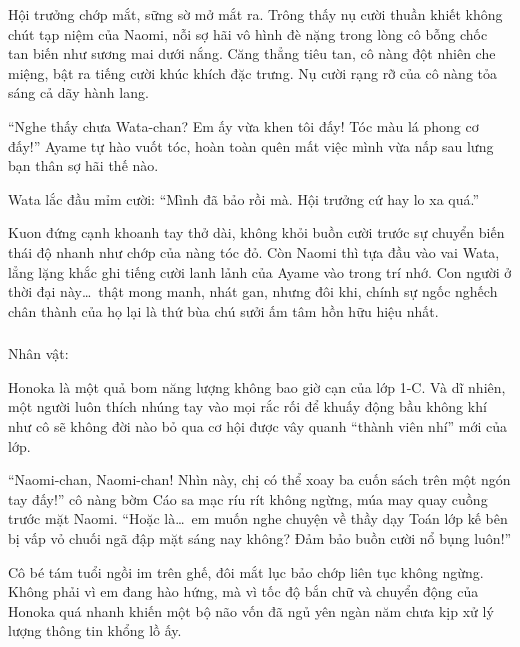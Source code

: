 \documentclass[../main.tex]{subfiles}
\begin{document}
Hội trưởng chớp mắt, sững sờ mở mắt ra. Trông thấy nụ cười thuần khiết không chút tạp niệm của Naomi, nỗi sợ hãi vô hình đè nặng trong lòng cô bỗng chốc tan biến như sương mai dưới nắng. Căng thẳng tiêu tan, cô nàng đột nhiên che miệng, bật ra tiếng cười khúc khích đặc trưng. Nụ cười rạng rỡ của cô nàng tỏa sáng cả dãy hành lang.

``Nghe thấy chưa Wata-chan? Em ấy vừa khen tôi đấy! Tóc màu lá phong cơ đấy!'' Ayame tự hào vuốt tóc, hoàn toàn quên mất việc mình vừa nấp sau lưng bạn thân sợ hãi thế nào.

Wata lắc đầu mỉm cười: ``Mình đã bảo rồi mà. Hội trưởng cứ hay lo xa quá.''

Kuon đứng cạnh khoanh tay thở dài, không khỏi buồn cười trước sự chuyển biến thái độ nhanh như chớp của nàng tóc đỏ. Còn Naomi thì tựa đầu vào vai Wata, lẳng lặng khắc ghi tiếng cười lanh lảnh của Ayame vào trong trí nhớ. Con người ở thời đại này\dots\ thật mong manh, nhát gan, nhưng đôi khi, chính sự ngốc nghếch chân thành của họ lại là thứ bùa chú sưởi ấm tâm hồn hữu hiệu nhất.

\newpage

\subsubsection*{\label{ep-ER6}}
\begin{center}{\caviar Nhân vật:  }\end{center}

Honoka là một quả bom năng lượng không bao giờ cạn của lớp 1-C. Và dĩ nhiên, một người luôn thích nhúng tay vào mọi rắc rối để khuấy động bầu không khí như cô sẽ không đời nào bỏ qua cơ hội được vây quanh ``thành viên nhí'' mới của lớp.

``Naomi-chan, Naomi-chan! Nhìn này, chị có thể xoay ba cuốn sách trên một ngón tay đấy!'' cô nàng bờm Cáo sa mạc ríu rít không ngừng, múa may quay cuồng trước mặt Naomi. ``Hoặc là\dots\ em muốn nghe chuyện về thầy dạy Toán lớp kế bên bị vấp vỏ chuối ngã đập mặt sáng nay không? Đảm bảo buồn cười nổ bụng luôn!''

Cô bé tám tuổi ngồi im trên ghế, đôi mắt lục bảo chớp liên tục không ngừng. Không phải vì em đang hào hứng, mà vì tốc độ bắn chữ và chuyển động của Honoka quá nhanh khiến một bộ não vốn đã ngủ yên ngàn năm chưa kịp xử lý lượng thông tin khổng lồ ấy.
\end{document}

